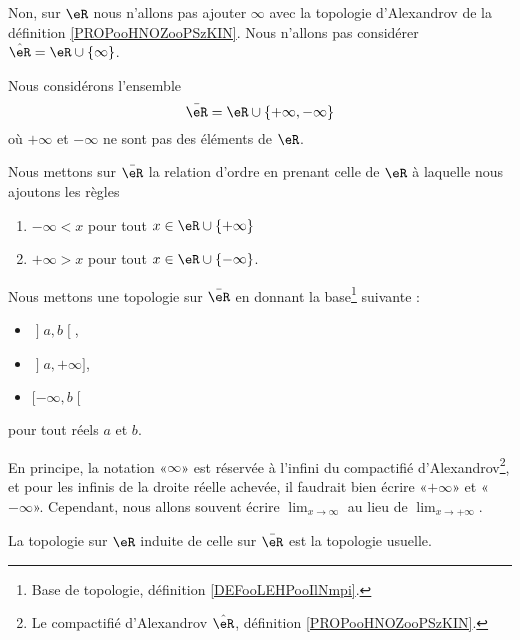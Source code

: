 Non, sur \( \eR\) nous n'allons pas ajouter \( \infty\) avec la topologie d'Alexandrov de la définition \ref{PROPooHNOZooPSzKIN}. Nous n'allons pas considérer \( \hat \eR=\eR\cup\{ \infty \}\).

\begin{definition}       \label{DEFooRUyiBSUooALDDOa}
    Nous considérons l'ensemble
    \begin{equation}
        \bar \eR=\eR\cup\{ +\infty,-\infty \}
    \end{equation}
    où \( +\infty\) et \( -\infty\) ne sont pas des éléments de \( \eR\).

    Nous mettons sur \( \bar\eR\) la relation d'ordre en prenant celle de \( \eR\) à laquelle nous ajoutons les règles
    \begin{enumerate}
        \item
            \( -\infty<x\) pour tout \( x\in\eR\cup\{ +\infty \}\)
        \item
            \( +\infty>x\) pour tout \( x\in \eR\cup\{-\infty  \}\).
    \end{enumerate}

    Nous mettons une topologie sur \( \bar\eR\) en donnant la base\footnote{Base de topologie, définition \ref{DEFooLEHPooIlNmpi}.} suivante :
    \begin{itemize}
        \item \( \mathopen] a , b \mathclose[\),
        \item \( \mathopen] a , +\infty \mathclose]\),
        \item \( \mathopen[ -\infty , b \mathclose[\)
    \end{itemize}
    pour tout réels \( a\) et \( b\).
\end{definition}

\begin{normaltext}
    En principe, la notation «\( \infty\)» est réservée à l'infini du compactifié d'Alexandrov\footnote{Le compactifié d'Alexandrov \( \hat \eR\), définition \ref{PROPooHNOZooPSzKIN}.}, et pour les infinis de la droite réelle achevée, il faudrait bien écrire «\( +\infty\)» et «\( -\infty\)». Cependant, nous allons souvent écrire \( \lim_{x\to \infty} \) au lieu de \( \lim_{x\to +\infty} \).
\end{normaltext}

\begin{lemma}
    La topologie sur \( \eR\) induite de celle sur \( \bar \eR\) est la topologie usuelle.
\end{lemma}

